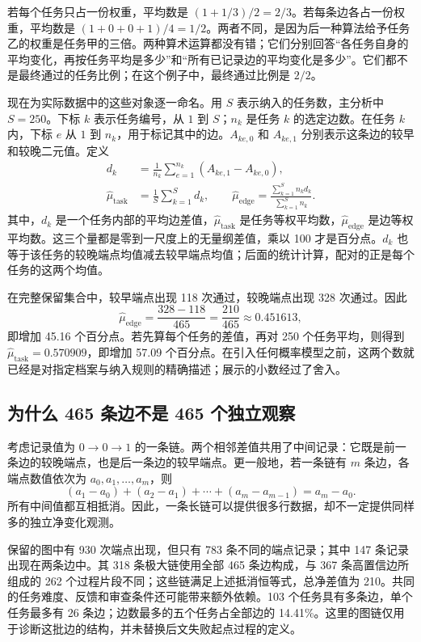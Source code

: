 若每个任务只占一份权重，平均数是 $(1+1/3)/2=2/3$。若每条边各占一份权重，平均数是 $(1+0+0+1)/4=1/2$。两者不同，是因为后一种算法给予任务乙的权重是任务甲的三倍。两种算术运算都没有错；它们分别回答“各任务自身的平均变化，再按任务平均是多少”和“所有已记录边的平均变化是多少”。它们都不是最终通过的任务比例；在这个例子中，最终通过比例是 $2/2$。

现在为实际数据中的这些对象逐一命名。用 $S$ 表示纳入的任务数，主分析中 $S=250$。下标 $k$ 表示任务编号，从 $1$ 到 $S$；$n_k$ 是任务 $k$ 的选定边数。在任务 $k$ 内，下标 $e$ 从 $1$ 到 $n_k$，用于标记其中的边。$A_{ke,0}$ 和 $A_{ke,1}$ 分别表示这条边的较早和较晚二元值。定义
\begin{equation}
\begin{split}
d_k&=\frac{1}{n_k}\sum_{e=1}^{n_k}(A_{ke,1}-A_{ke,0}),\\
\widehat\mu_{\mathrm{task}}&=\frac{1}{S}\sum_{k=1}^{S}d_k,
\qquad
\widehat\mu_{\mathrm{edge}}=\frac{\sum_{k=1}^{S}n_kd_k}{\sum_{k=1}^{S}n_k}.
\end{split}
\label{eq:paired-estimands}
\end{equation}
其中，$d_k$ 是一个任务内部的平均边差值，$\widehat\mu_{\mathrm{task}}$ 是任务等权平均数，$\widehat\mu_{\mathrm{edge}}$ 是边等权平均数。这三个量都是零到一尺度上的无量纲差值，乘以 100 才是百分点。$d_k$ 也等于该任务的较晚端点均值减去较早端点均值；后面的统计计算，配对的正是每个任务的这两个均值。

在完整保留集合中，较早端点出现 118 次通过，较晚端点出现 328 次通过。因此
\[
\widehat\mu_{\mathrm{edge}}=\frac{328-118}{465}
=\frac{210}{465}\approx0.451613,
\]
即增加 45.16 个百分点。若先算每个任务的差值，再对 250 个任务平均，则得到 $\widehat\mu_{\mathrm{task}}=0.570909$，即增加 57.09 个百分点。在引入任何概率模型之前，这两个数就已经是对指定档案与纳入规则的精确描述；展示的小数经过了舍入。

\subsection{为什么 465 条边不是 465 个独立观察}
\label{subsec:edge-dependence}
考虑记录值为 $0\to0\to1$ 的一条链。两个相邻差值共用了中间记录：它既是前一条边的较晚端点，也是后一条边的较早端点。更一般地，若一条链有 $m$ 条边，各端点数值依次为 $a_0,a_1,\ldots,a_m$，则
\[
(a_1-a_0)+(a_2-a_1)+\cdots+(a_m-a_{m-1})=a_m-a_0.
\]
所有中间值都互相抵消。因此，一条长链可以提供很多行数据，却不一定提供同样多的独立净变化观测。

保留的图中有 930 次端点出现，但只有 783 条不同的端点记录；其中 147 条记录出现在两条边中。其 318 条极大链使用全部 465 条边构成，与 367 条高置信边所组成的 262 个过程片段不同；这些链满足上述抵消恒等式，总净差值为 210。共同的任务难度、反馈和审查条件还可能带来额外依赖。103 个任务具有多条边，单个任务最多有 26 条边；边数最多的五个任务占全部边的 14.41\%。这里的图链仅用于诊断这批边的结构，并未替换后文失败起点过程的定义。

